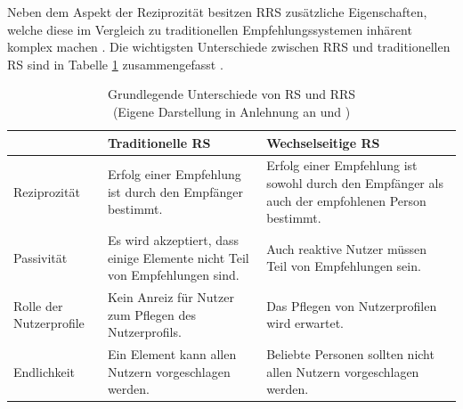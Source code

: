 Neben dem Aspekt der Reziprozität besitzen \ac{RRS} zusätzliche Eigenschaften, welche diese im Vergleich zu traditionellen Empfehlungssystemen inhärent komplex machen \cite[S. 2429]{palomares:inproceedings}\cite[S. 35]{li:inproceedings}\cite[S. 207]{pizzato:2010}.
Die wichtigsten Unterschiede zwischen \ac{RRS} und traditionellen \ac{RS} sind in Tabelle \ref{tab2} zusammengefasst \cite[S. 546]{koprinska:inbook}.

\begin{table}[htbp]
    \begin{center}
        \begin{tabular}{|p{}||p{}|p{}|}
            \hline
             & {\textbf{Traditionelle \ac{RS}}} & {\textbf{Wechselseitige \ac{RS}}} \\
            \hline
            \hline
            Reziprozität & Erfolg einer Empfehlung ist durch den Empfänger bestimmt. &  Erfolg einer Empfehlung ist sowohl durch den Empfänger als auch der empfohlenen Person bestimmt. \\
            \hline
            Passivität & Es wird akzeptiert, dass einige Elemente nicht Teil von Empfehlungen sind. &  Auch reaktive Nutzer müssen Teil von Empfehlungen sein. \\
            \hline
            Rolle der Nutzerprofile & Kein Anreiz für Nutzer zum Pflegen des Nutzerprofils. &  Das Pflegen von Nutzerprofilen wird erwartet. \\
            \hline
            Endlichkeit & Ein Element kann allen Nutzern vorgeschlagen werden. & Beliebte Personen sollten nicht allen Nutzern vorgeschlagen werden. \\
            \hline
    \end{tabular}
    \end{center}
    \caption[Grundlegende Unterschiede von RS und RRS]{Grundlegende Unterschiede von RS und RRS \\
	(Eigene Darstellung in Anlehnung an \cite[S. 546]{koprinska:inbook} und \cite[S. 35f.]{li:inproceedings})}
	\label{tab2}
\end{table}

